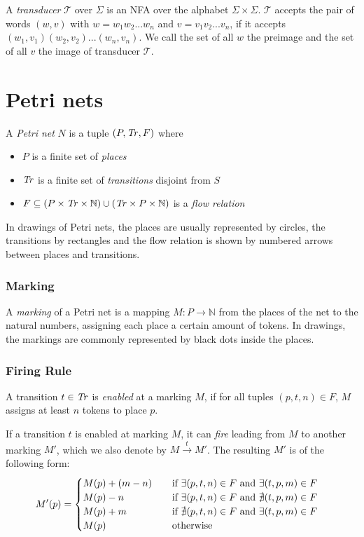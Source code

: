A \emph{transducer} $\mathcal{T}$ over $\Sigma$ is an NFA over the alphabet $\Sigma \times \Sigma$. $\mathcal{T}$ accepts the pair of words $(w,v)$ with $w = w_{1}w_{2}...w_{n}$ and $v=v_{1}v_{2}...v_{n}$, if it accepts $(w_{1},v_{1})(w_{2},v_{2})...(w_{n},v_{n})$.
We call the set of all $w$ the preimage and the set of all $v$ the image of transducer $\mathcal{T}$.


\section{Petri nets}

A \emph{Petri net} $N$ is a tuple $(P,\mathit{Tr},F)$ where 
\begin{itemize}[-,noitemsep]
	\item $P$ is a finite set of \emph{places}
	\item $\mathit{Tr}$ is a finite set of \emph{transitions} disjoint from $S$
	\item $F \subseteq (P \times \mathit{Tr} \times \mathbb{N}) \cup (\mathit{Tr} \times P \times \mathbb{N})$ is a \emph{flow relation}
\end{itemize}

In drawings of Petri nets, the places are usually represented by circles, the transitions by rectangles and the flow relation is shown by numbered arrows between places and transitions.

\subsubsection{Marking}
A \emph{marking} of a Petri net is a mapping $M : P \rightarrow \mathbb{N}$ from the places of the net to the natural numbers, assigning each place a certain amount of tokens. In drawings, the markings are commonly represented by black dots inside the places.


\subsubsection{Firing Rule}
A transition $t \in \mathit{Tr}$ is \emph{enabled} at a marking $M$, if for all tuples $(p,t,n) \in F$, $M$ assigns at least $n$ tokens to place $p$.

If a transition $t$ is enabled at marking $M$, it can \emph{fire} leading from $M$ to another marking $M'$, which we also denote by  $M \xrightarrow{t} M'$. 
The resulting $M'$ is of the following form:
\begin{equation*}
M'(p) =  
\begin{cases}
\mathrlap{M(p) + (m - n)}\hphantom{M(p) + (m - n) + 1} \text{ if } \exists (p,t,n) \in F \text{ and } \exists (t,p,m) \in F \\
\mathrlap{M(p) - n}\hphantom{M(p) + (m - n) + 1} \text{ if } \exists (p,t,n) \in F \text{ and } \nexists (t,p,m) \in F \\
\mathrlap{M(p) + m}\hphantom{M(p) + (m - n) + 1} \text{ if }  \nexists (p,t,n) \in F \text{ and } \exists (t,p,m) \in F  \\
\mathrlap{M(p)}\hphantom{M(p) + (m - n) + 1} \text{ otherwise}
\end{cases}
\end{equation*}

